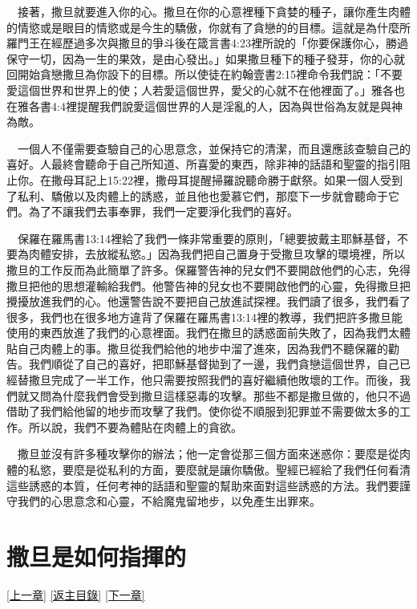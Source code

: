 \documentclass{book}
\begin{document}
　接著，撒旦就要進入你的心。撒旦在你的心意裡種下貪婪的種子，讓你產生肉體的情慾或是眼目的情慾或是今生的驕傲，你就有了貪戀的的目標。這就是為什麼所羅門王在經歷過多次與撒旦的爭斗後在箴言書4:23裡所說的「你要保護你心，勝過保守一切，因為一生的果效，是由心發出。」如果撒旦種下的種子發芽，你的心就回開始貪戀撒旦為你設下的目標。所以使徒在約翰壹書2:15裡命令我們說：「不要愛這個世界和世界上的使；人若愛這個世界，愛父的心就不在他裡面了。」雅各也在雅各書4:4裡提醒我們說愛這個世界的人是淫亂的人，因為與世俗為友就是與神為敵。

　一個人不僅需要查驗自己的心思意念，並保持它的清潔，而且還應該查驗自己的喜好。人最終會聽命于自己所知道、所喜愛的東西，除非神的話語和聖靈的指引阻止你。在撒母耳記上15:22裡，撒母耳提醒掃羅說聽命勝于獻祭。如果一個人受到了私利、驕傲以及肉體上的誘惑，並且他也愛慕它們，那麼下一步就會聽命于它們。為了不讓我們去事奉罪，我們一定要淨化我們的喜好。

　保羅在羅馬書13:14裡給了我們一條非常重要的原則，「總要披戴主耶穌基督，不要為肉體安排，去放縱私慾。」因為我們把自己置身于受撒旦攻擊的環境裡，所以撒旦的工作反而為此簡單了許多。保羅警告神的兒女們不要開啟他們的心志，免得撒旦把他的思想灌輸給我們。他警告神的兒女也不要開啟他們的心靈，免得撒旦把攪擾放進我們的心。他還警告說不要把自己放進試探裡。我們讀了很多，我們看了很多，我們也在很多地方違背了保羅在羅馬書13:14裡的教導，我們把許多撒旦能使用的東西放進了我們的心意裡面。我們在撒旦的誘惑面前失敗了，因為我們太體貼自己肉體上的事。撒旦從我們給他的地步中溜了進來，因為我們不聽保羅的勸告。我們順從了自己的喜好，把耶穌基督拋到了一邊，我們貪戀這個世界，自己已經替撒旦完成了一半工作，他只需要按照我們的喜好繼續他敗壞的工作。而後，我們就又問為什麼我們會受到撒旦這樣惡毒的攻擊。那些不都是撒旦做的，他只不過借助了我們給他留的地步而攻擊了我們。使你從不順服到犯罪並不需要做太多的工作。所以說，我們不要為體貼在肉體上的貪欲。

　撒旦並沒有許多種攻擊你的辦法；他一定會從那三個方面來迷惑你：要麼是從肉體的私慾，要麼是從私利的方面，要麼就是讓你驕傲。聖經已經給了我們任何看清這些誘惑的本質，任何考神的話語和聖靈的幫助來面對這些誘惑的方法。我們要謹守我們的心思意念和心靈，不給魔鬼留地步，以免產生出罪來。

\chapter{撒旦是如何指揮的}
\label{sec:ch15}
\hyperref[sec:ch14]{[上一章]}
\hyperlink{toc}{[返主目錄]}
\hyperref[sec:ch16]{[下一章]}
\end{document}
